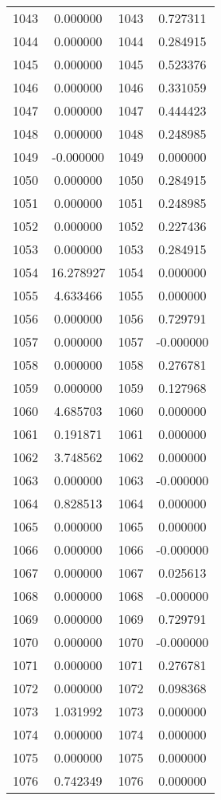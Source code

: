 \documentclass[12pt]{article}
\begin{document}
\begin{longtable}{@{}cccc@{}}
1043 & 0.000000 & 1043 & 0.727311 \\
1044 & 0.000000 & 1044 & 0.284915 \\
1045 & 0.000000 & 1045 & 0.523376 \\
1046 & 0.000000 & 1046 & 0.331059 \\
1047 & 0.000000 & 1047 & 0.444423 \\
1048 & 0.000000 & 1048 & 0.248985 \\
1049 & -0.000000 & 1049 & 0.000000 \\
1050 & 0.000000 & 1050 & 0.284915 \\
1051 & 0.000000 & 1051 & 0.248985 \\
1052 & 0.000000 & 1052 & 0.227436 \\
1053 & 0.000000 & 1053 & 0.284915 \\
1054 & 16.278927 & 1054 & 0.000000 \\
1055 & 4.633466 & 1055 & 0.000000 \\
1056 & 0.000000 & 1056 & 0.729791 \\
1057 & 0.000000 & 1057 & -0.000000 \\
1058 & 0.000000 & 1058 & 0.276781 \\
1059 & 0.000000 & 1059 & 0.127968 \\
1060 & 4.685703 & 1060 & 0.000000 \\
1061 & 0.191871 & 1061 & 0.000000 \\
1062 & 3.748562 & 1062 & 0.000000 \\
1063 & 0.000000 & 1063 & -0.000000 \\
1064 & 0.828513 & 1064 & 0.000000 \\
1065 & 0.000000 & 1065 & 0.000000 \\
1066 & 0.000000 & 1066 & -0.000000 \\
1067 & 0.000000 & 1067 & 0.025613 \\
1068 & 0.000000 & 1068 & -0.000000 \\
1069 & 0.000000 & 1069 & 0.729791 \\
1070 & 0.000000 & 1070 & -0.000000 \\
1071 & 0.000000 & 1071 & 0.276781 \\
1072 & 0.000000 & 1072 & 0.098368 \\
1073 & 1.031992 & 1073 & 0.000000 \\
1074 & 0.000000 & 1074 & 0.000000 \\
1075 & 0.000000 & 1075 & 0.000000 \\
1076 & 0.742349 & 1076 & 0.000000 \\

\end{longtable}
\end{document}
